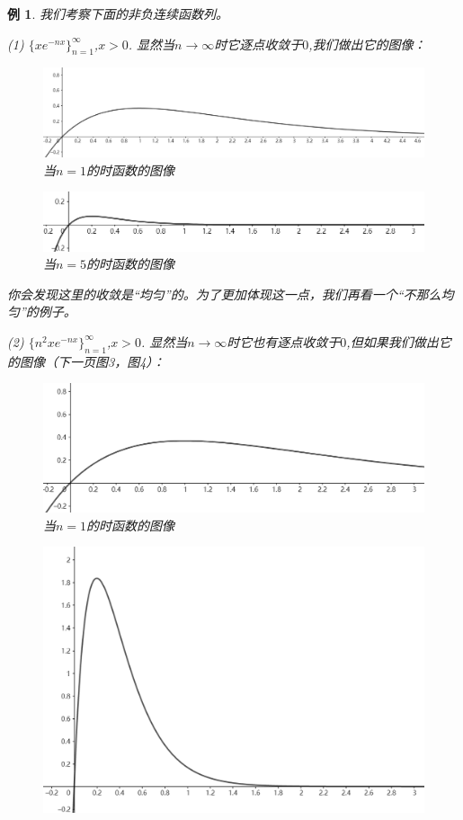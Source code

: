 \documentclass{article}
\newtheorem{example}{例}[subsection]
\begin{document}
\begin{example}
我们考察下面的非负连续函数列。\par
(1) $\{xe^{-nx}\}_{n=1}^\infty$,$x>0$. 显然当$n\to\infty$时它逐点收敛于$0$,我们做出它的图像：\par
\begin{figure}[htbp]
    \center
    \includegraphics[scale=0.19]{picture/image1.png}
    \caption{当$n=1$的时函数的图像}
\end{figure}
\begin{figure}[htbp]
    \center
    \includegraphics[scale=0.3]{picture/image2.png}
    \caption{当$n=5$的时函数的图像}
\end{figure}
你会发现这里的收敛是“均匀”的。为了更加体现这一点，我们再看一个“不那么均匀”的例子。\par
(2) $\{n^2xe^{-nx}\}_{n=1}^\infty$,$x>0$. 显然当$n\to\infty$时它也有逐点收敛于$0$,但如果我们做出它的图像（下一页图3，图4）：
\begin{figure}[htbp]
    \center
    \includegraphics[scale=0.19]{picture/image3.png}
    \caption{当$n=1$的时函数的图像}
\end{figure}
\begin{figure}[htbp]
    \center
    \includegraphics[scale=0.25]{picture/image4.png}

\end{figure}
\end{example}
\end{document}
